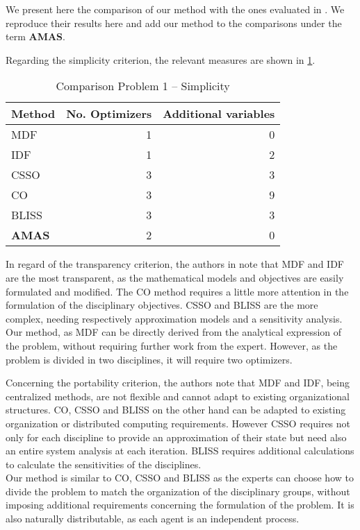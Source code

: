 We present here the comparison of our method with the ones evaluated in \cite{perez2004evaluation}. We reproduce their results here and add our method to the comparisons under the term \textbf{AMAS}.

Regarding the simplicity criterion, the relevant measures are shown in \tablename{} \ref{bench1_simplicity}.

\begin{table}
\caption{Comparison Problem 1 -- Simplicity}\label{bench1_simplicity}
\centering
\begin{tabular}{lrr}
\toprule
Method & No. Optimizers & Additional variables\\
\midrule
MDF					&	1	&	0	\\
IDF						&	1	&	2	\\
CSSO					& 3	&	3	\\
CO						&	3	&	9	\\
BLISS					&	3	&	3	\\
\textbf{AMAS}	&	2	&	0	\\
\bottomrule
\end{tabular}
\end{table}

In regard of the transparency criterion, the authors in \cite{perez2004evaluation} note that MDF and IDF are the most transparent, as the mathematical models and objectives are easily formulated and modified. The CO method requires a little more attention in the formulation of the disciplinary objectives. CSSO and BLISS are the more complex, needing respectively approximation models and a sensitivity analysis.\\
Our method, as MDF can be directly derived from the analytical expression of the problem, without requiring further work from the expert. However, as the problem is divided in two disciplines, it will require two optimizers.

Concerning the portability criterion, the authors note that  MDF and IDF, being centralized methods, are not flexible and cannot adapt to existing organizational structures. CO, CSSO and BLISS on the other hand can be adapted to existing organization or distributed computing requirements. However CSSO requires not only for each discipline to provide an approximation of their state but need also an entire system analysis at each iteration. BLISS requires additional calculations to calculate the sensitivities of the disciplines.\\
Our method is similar to CO, CSSO and BLISS as the experts can choose how to divide the problem to match the organization of the disciplinary groups, without imposing additional requirements concerning the formulation of the problem. It is also naturally distributable, as each agent is an independent process.

